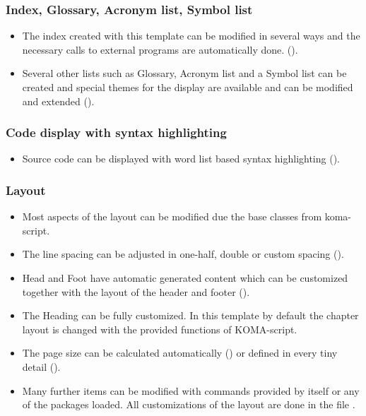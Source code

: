 \subsubsection*{Index, Glossary, Acronym list, Symbol list}
\begin{itemize}
\item The index created with this template can be modified in several ways and the necessary calls to external programs are automatically done. ().   
%
\item Several other lists such as Glossary, Acronym list and a Symbol list can be created and special themes for the display are available and can be modified and extended ().
\end{itemize}

\subsubsection*{Code display with syntax highlighting}
\begin{itemize}
\item Source code can be displayed with word list based syntax highlighting ().
\end{itemize}

\subsubsection*{Layout}
\begin{itemize}
\item Most aspects of the layout can be modified due the base classes from koma-script. 
%
\item The line spacing can be adjusted in one-half, double or custom spacing ().
%
\item Head and Foot have automatic generated content which can be customized together with the layout of the header and footer ().
%
\item The Heading can be fully customized. In this template by default the chapter layout is changed with the provided functions of KOMA-script.
%
\item The page size can be calculated automatically () or defined in every tiny detail ().
%
\item Many further items can be modified with commands provided by \latex itself or any of the packages loaded. All customizations of the layout are done in the file .
\end{itemize}

